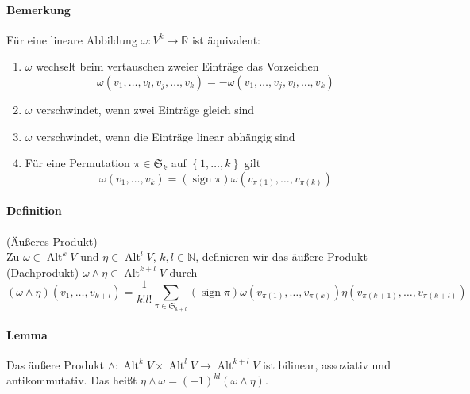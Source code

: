 \documentclass[12pt,a4paper,fleqn]{article}
\def\set#1{{\left\{ #1 \right\}}}
\def\R{{\mathbb{R}}}
\begin{document}
\paragraph{Bemerkung} Für eine lineare Abbildung $\omega\colon V^k \rightarrow \R$ ist äquivalent:
\begin{enumerate}
\item $\omega$ wechselt beim vertauschen zweier Einträge das Vorzeichen
\begin{displaymath}
\omega(v_1, \dots, v_l, v_j, \dots, v_k) = -\omega(v_1, \dots, v_j, v_l, \dots, v_k)
\end{displaymath}
\item $\omega$ verschwindet, wenn zwei Einträge gleich sind
\item $\omega$ verschwindet, wenn die Einträge linear abhängig sind
\item Für eine Permutation $\pi \in \mathfrak{S}_k$ auf $\set{1, \dots, k}$ gilt
\begin{displaymath}
\omega(v_1, \dots, v_k) = (\operatorname{sign} \pi)\omega(v_{\pi(1)}, \dots, v_{\pi(k)})
\end{displaymath}
\end{enumerate}

\paragraph{Definition} (Äußeres Produkt)\\
Zu $\omega \in \operatorname{Alt}^k V$ und $\eta \in \operatorname{Alt}^l V$, $k, l \in \mathbb{N}$, definieren wir das äußere Produkt (Dachprodukt) $\omega \wedge \eta \in \operatorname{Alt}^{k + l} V$ durch
\begin{displaymath}
(\omega \wedge \eta)(v_1, \dots, v_{k+l}) = \frac{1}{k! l!} \sum_{\pi \in\mathfrak{S}_{k+l}} (\operatorname{sign}\pi)\omega(v_{\pi(1)}, \dots, v_{\pi(k)})\eta(v_{\pi(k+1)}, \dots, v_{\pi(k+l)})
\end{displaymath}

\paragraph{Lemma} Das äußere Produkt $\wedge\colon \operatorname{Alt}^k V \times \operatorname{Alt}^l V \rightarrow \operatorname{Alt}^{k+l} V$ ist bilinear, assoziativ und antikommutativ. Das heißt $\eta \wedge \omega = (-1)^{kl}(\omega \wedge \eta)$.
\end{document}
